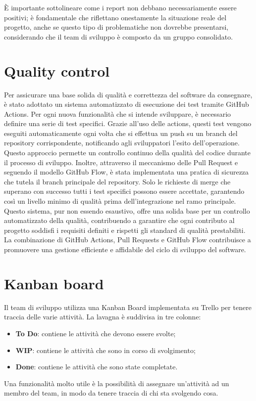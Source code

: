 \documentclass[a4paper,12pt, openright]{report}
\begin{document}
È importante sottolineare come i report non debbano necessariamente essere positivi; è fondamentale che riflettano onestamente la situazione reale del progetto, anche se questo tipo di problematiche non dovrebbe presentarsi, considerando che il team di sviluppo è composto da un gruppo consolidato.
\section{Quality control}
Per assicurare una base solida di qualità e correttezza del software da consegnare, è stato adottato un sistema automatizzato di esecuzione dei test tramite GitHub Actions. Per ogni nuova funzionalità che si intende sviluppare, è necessario definire una serie di test specifici. Grazie all'uso delle actions, questi test vengono eseguiti automaticamente ogni volta che si effettua un push su un branch del repository corrispondente, notificando agli sviluppatori l'esito dell'operazione. Questo approccio permette un controllo continuo della qualità del codice durante il processo di sviluppo.
Inoltre, attraverso il meccanismo delle Pull Request e seguendo il modello GitHub Flow, è stata implementata una pratica di sicurezza che tutela il branch principale del repository. Solo le richieste di merge che superano con successo tutti i test specifici possono essere accettate, garantendo così un livello minimo di qualità prima dell'integrazione nel ramo principale. Questo sistema, pur non essendo esaustivo, offre una solida base per un controllo automatizzato della qualità, contribuendo a garantire che ogni contributo al progetto soddisfi i requisiti definiti e rispetti gli standard di qualità prestabiliti.
La combinazione di GitHub Actions, Pull Requests e GitHub Flow contribuisce a promuovere una gestione efficiente e affidabile del ciclo di sviluppo del software.

\section{Kanban board}
Il team di sviluppo utilizza una Kanban Board implementata su Trello per tenere traccia delle varie attività.
La lavagna è suddivisa in tre colonne:
\begin{itemize}
    \item \textbf{To Do}: contiene le attività che devono essere svolte;
    \item \textbf{WIP}: contiene le attività che sono in corso di svolgimento;
    \item \textbf{Done}: contiene le attività che sono state completate.
\end{itemize}
Una funzionalità molto utile è la possibilità di assegnare un'attività ad un membro del team, in modo da tenere traccia di chi sta svolgendo cosa.
\end{document}
